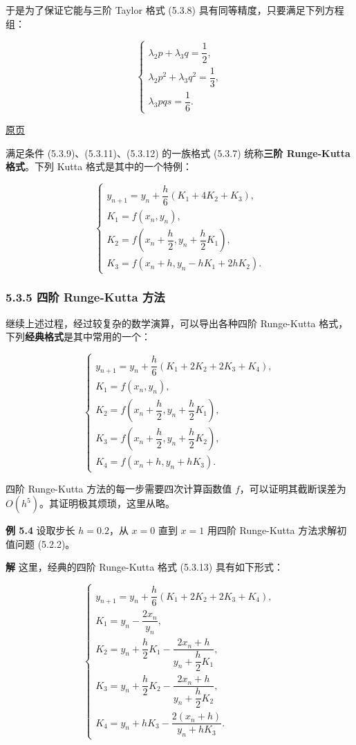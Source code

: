 \documentclass[
  10pt,
  fontset=fandol]{ctexart}
\begin{document}
于是为了保证它能与三阶 Taylor 格式 (5.3.8) 具有同等精度，只要满足下列方程组：

\[
\begin{cases}
\lambda_2p+\lambda_3q=\dfrac12,\\
\lambda_2p^2+\lambda_3q^2=\dfrac13,\\
\lambda_3pqs=\dfrac16.
\end{cases}\tag{5.3.12}
\]

\href{../../source-images/pdf-131.jpeg}{原页}

满足条件 (5.3.9)、(5.3.11)、(5.3.12) 的一族格式 (5.3.7) 统称\textbf{三阶 Runge-Kutta 格式}。下列 Kutta 格式是其中的一个特例：

\[
\begin{cases}
y_{n+1}=y_n+\dfrac{h}{6}(K_1+4K_2+K_3),\\
K_1=f(x_n,y_n),\\
K_2=f\left(x_n+\dfrac{h}{2},y_n+\dfrac{h}{2}K_1\right),\\
K_3=f(x_n+h,y_n-hK_1+2hK_2).
\end{cases}
\]

\subsubsection{5.3.5 四阶 Runge-Kutta 方法}\label{ux56dbux9636-runge-kutta-ux65b9ux6cd5}

继续上述过程，经过较复杂的数学演算，可以导出各种四阶 Runge-Kutta 格式，下列\textbf{经典格式}是其中常用的一个：

\[
\begin{cases}
y_{n+1}=y_n+\dfrac{h}{6}(K_1+2K_2+2K_3+K_4),\\
K_1=f(x_n,y_n),\\
K_2=f\left(x_n+\dfrac{h}{2},y_n+\dfrac{h}{2}K_1\right),\\
K_3=f\left(x_n+\dfrac{h}{2},y_n+\dfrac{h}{2}K_2\right),\\
K_4=f(x_n+h,y_n+hK_3).
\end{cases}\tag{5.3.13}
\]

四阶 Runge-Kutta 方法的每一步需要四次计算函数值 \(f\)，可以证明其截断误差为 \(O(h^5)\)。其证明极其烦琐，这里从略。

\textbf{例 5.4} 设取步长 \(h=0.2\)，从 \(x=0\) 直到 \(x=1\) 用四阶 Runge-Kutta 方法求解初值问题 (5.2.2)。

\textbf{解} 这里，经典的四阶 Runge-Kutta 格式 (5.3.13) 具有如下形式：

\[
\begin{cases}
y_{n+1}=y_n+\dfrac{h}{6}(K_1+2K_2+2K_3+K_4),\\
K_1=y_n-\dfrac{2x_n}{y_n},\\
K_2=y_n+\dfrac{h}{2}K_1-\dfrac{2x_n+h}{y_n+\dfrac{h}{2}K_1},\\
K_3=y_n+\dfrac{h}{2}K_2-\dfrac{2x_n+h}{y_n+\dfrac{h}{2}K_2},\\
K_4=y_n+hK_3-\dfrac{2(x_n+h)}{y_n+hK_3}.
\end{cases}
\]
\end{document}
